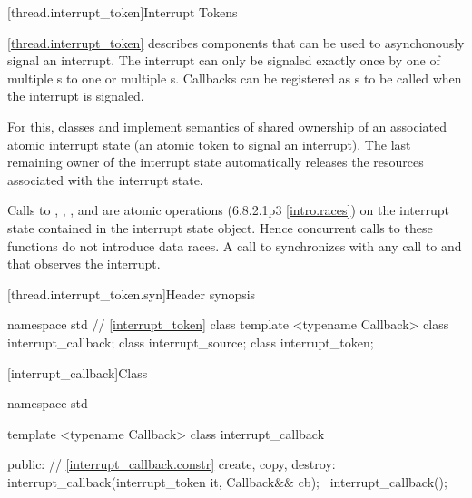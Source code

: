 {\color{insertcolor}

[thread.interrupt_token]{Interrupt Tokens}

\pnum
\ref{thread.interrupt_token} describes components that can be used to
asynchonously signal an interrupt.
The interrupt can only be signaled exactly once
by one of multiple s to one or multiple s.
Callbacks can be registered as s to be called when the interrupt is signaled.

For this, classes  and  implement semantics of shared ownership of an
associated atomic interrupt state (an atomic token to signal an interrupt).
The last remaining owner of the interrupt state automatically 
releases the resources associated with the interrupt state.

\pnum
Calls to , ,
, and 
are atomic operations (6.8.2.1p3 \ref{intro.races})
on the interrupt state contained in the interrupt state object.
Hence concurrent calls to these functions do not introduce data races. 
A call to  synchronizes with any call to  and
 that observes the interrupt.

[thread.interrupt_token.syn]{Header  synopsis}
%

\begin{codeblock}
namespace std {
  // \ref{interrupt_token} class 
  template <typename Callback> class interrupt_callback;
  class interrupt_source;
  class interrupt_token;
}
\end{codeblock}


%
[interrupt_callback]{Class }

\pnum
{}%

\begin{codeblock}
namespace std {
  template <typename Callback>
  class interrupt_callback {
  public:
    // \ref{interrupt_callback.constr} create, copy, destroy:
    interrupt_callback(interrupt_token it, Callback&& cb);
    ~interrupt_callback();

}}
\end{codeblock}}
